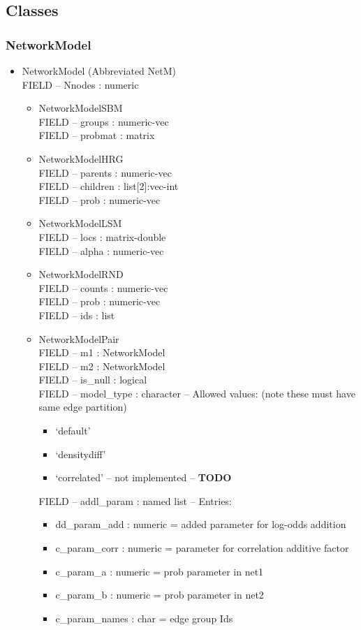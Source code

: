 \documentclass[11pt]{article}
\begin{document}
\subsection{Classes}

\subsubsection{NetworkModel}
\begin{itemize}
\item NetworkModel (Abbreviated NetM)\\
FIELD -- Nnodes : numeric
\begin{itemize}
\item NetworkModelSBM\\
FIELD -- groups : numeric-vec \\
FIELD -- probmat : matrix\\
\item NetworkModelHRG\\
FIELD -- parents : numeric-vec\\
FIELD -- children : list[2]:vec-int\\
FIELD -- prob : numeric-vec\\
\item NetworkModelLSM\\
FIELD -- locs : matrix-double\\
FIELD -- alpha : numeric-vec\\
\item NetworkModelRND\\
FIELD -- counts : numeric-vec\\
FIELD -- prob : numeric-vec\\
FIELD -- ids : list\\
\item NetworkModelPair\\
FIELD -- m1 : NetworkModel\\
FIELD -- m2 : NetworkModel\\
FIELD -- is\_null : logical\\
FIELD -- model\_type : character -- Allowed values: (note these must have same edge partition)
\begin{itemize}
\item `default'
\item `densitydiff'
\item `correlated' -- not implemented -- {\bf TODO}
\end{itemize}
FIELD -- addl\_param : named list -- Entries: 
\begin{itemize}
\item dd\_param\_add : numeric = added parameter for log-odds addition
\item c\_param\_corr : numeric = parameter for correlation additive factor
\item c\_param\_a : numeric = prob parameter in net1
\item c\_param\_b : numeric = prob parameter in net2
\item c\_param\_names : char = edge group Ids
\end{itemize}
\end{itemize}
\end{itemize}
\end{document}
